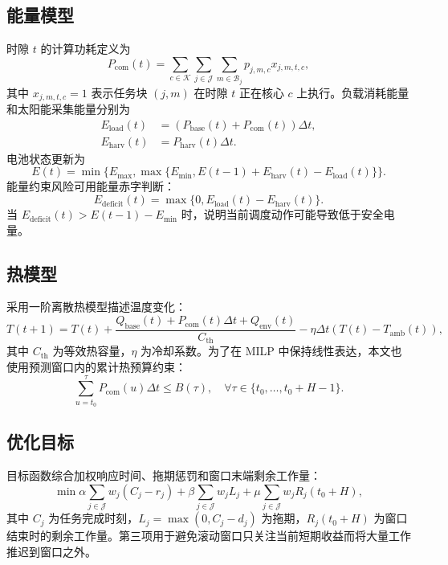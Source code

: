 \subsection{能量模型}

时隙 $t$ 的计算功耗定义为
\begin{equation}
P_{\mathrm{com}}(t)=
\sum_{c\in\mathcal{K}}\sum_{j\in\mathcal{J}}\sum_{m\in\mathcal{B}_j}
p_{j,m,c}x_{j,m,t,c},
\end{equation}
其中 $x_{j,m,t,c}=1$ 表示任务块 $(j,m)$ 在时隙 $t$ 正在核心 $c$ 上执行。负载消耗能量和太阳能采集能量分别为
\begin{align}
E_{\mathrm{load}}(t)&=\left(P_{\mathrm{base}}(t)+P_{\mathrm{com}}(t)\right)\Delta t,\\
E_{\mathrm{harv}}(t)&=P_{\mathrm{harv}}(t)\Delta t.
\end{align}
电池状态更新为
\begin{equation}
E(t)=\min\{E_{\max},\max\{E_{\min},E(t-1)+E_{\mathrm{harv}}(t)-E_{\mathrm{load}}(t)\}\}.
\end{equation}
能量约束风险可用能量赤字判断：
\begin{equation}
E_{\mathrm{deficit}}(t)=\max\{0,E_{\mathrm{load}}(t)-E_{\mathrm{harv}}(t)\}.
\end{equation}
当 $E_{\mathrm{deficit}}(t)>E(t-1)-E_{\min}$ 时，说明当前调度动作可能导致低于安全电量。

\subsection{热模型}

采用一阶离散热模型描述温度变化：
\begin{equation}
T(t+1)=T(t)+\frac{Q_{\mathrm{base}}(t)+P_{\mathrm{com}}(t)\Delta t+Q_{\mathrm{env}}(t)}{C_{\mathrm{th}}}
-\eta\Delta t\left(T(t)-T_{\mathrm{amb}}(t)\right),
\end{equation}
其中 $C_{\mathrm{th}}$ 为等效热容量，$\eta$ 为冷却系数。为了在 MILP 中保持线性表达，本文也使用预测窗口内的累计热预算约束：
\begin{equation}
\sum_{u=t_0}^{\tau}P_{\mathrm{com}}(u)\Delta t \le B(\tau),\quad
\forall \tau\in\{t_0,\dots,t_0+H-1\}.
\end{equation}

\subsection{优化目标}

目标函数综合加权响应时间、拖期惩罚和窗口末端剩余工作量：
\begin{equation}
\min
\alpha\sum_{j\in\mathcal{J}}w_j(C_j-r_j)
+\beta\sum_{j\in\mathcal{J}}w_jL_j
+\mu\sum_{j\in\mathcal{J}}w_jR_j(t_0+H),
\label{eq:objective}
\end{equation}
其中 $C_j$ 为任务完成时刻，$L_j=\max(0,C_j-d_j)$ 为拖期，$R_j(t_0+H)$ 为窗口结束时的剩余工作量。第三项用于避免滚动窗口只关注当前短期收益而将大量工作推迟到窗口之外。

